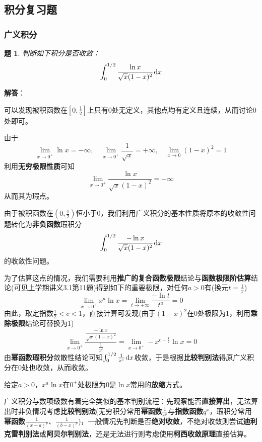 \documentclass[a4paper,UTF8,fontset=windows,AutoFakeBold]{ctexart}
\newcommand*{\dr}{\hspace{0.07em}\mathrm{d}}
\newcommand*{\note}{\noindent *}
\theoremstyle{ex}
\newtheorem{exercise}{题}
\newcommand{\sol}[1]{{\vspace{5pt}\kaishu\noindent\textbf{解答}：\vspace{-3pt}
\begin{compactitem}
    \item[] #1
\end{compactitem}
}}
\begin{document}
\subsection{积分复习题}
\subsubsection{广义积分}
\begin{framed}
\begin{exercise}\label{xlnx}
    判断如下积分是否收敛：
    $$\int_0^{1/2}\frac{\ln x}{\sqrt{x}(1-x)^2}\dr x$$
\end{exercise}
\sol{
    可以发现被积函数在$[0,\frac{1}{2}]$上只有0处无定义，其他点均有定义且连续，从而讨论0处即可。
    
    由于
    $$\lim_{x\to0^+}\ln x=-\infty,\quad\lim_{x\to0^+}\frac{1}{\sqrt{x}}=+\infty,\quad\lim_{x\to0}(1-x)^2=1$$
    利用\textbf{无穷极限性质}可知
    $$\lim_{x\to0^+}\frac{\ln x}{\sqrt{x}(1-x)^2}=-\infty$$
    从而其为瑕点。

    由于被积函数在$(0,\frac{1}{2})$恒小于0，我们利用广义积分的基本性质将原本的收敛性问题转化为\textbf{非负函数}瑕积分
    $$\int_0^{1/2}\frac{-\ln x}{\sqrt{x}(1-x)^2}\dr x$$
    的收敛性问题。

    为了估算这点的情况，我们需要利用\textbf{推广的复合函数极限}结论与\textbf{函数极限阶估算}结论(可见上学期讲义3.1第11题)得到如下的重要极限，对任何$a>0$有(换元$t=\frac{1}{x}$)
    $$\lim_{x\to0^+}x^a\ln x=\lim_{t\to+\infty}\frac{-\ln t}{t^a}=0$$
    由此，取定指数$\frac{1}{2}<c<1$，直接计算可发现(由于$(1-x)^2$在0处极限为1，利用\textbf{乘除极限}结论可替换为1)
    $$\lim_{x\to0^+}\frac{\frac{-\ln x}{\sqrt{x}(1-x)^2}}{\frac{1}{x^c}}=\lim_{x\to0^+}-x^{c-\frac{1}{2}}\ln x=0$$
    由\textbf{幂函数瑕积分}敛散性结论可知$\int_0^{1/2}\frac{1}{x^c}\dr x$收敛，于是根据\textbf{比较判别法}得原广义积分在0处也收敛，从而收敛。
}
\end{framed}

\note 给定$a>0$，$x^a\ln x$在$0^+$处极限为0是$\ln x$常用的\textbf{放缩}方式。

\note 广义积分与数项级数有着完全类似的基本判别流程：先观察能否\textbf{直接算出}，无法算出时非负情况考虑\textbf{比较判别法}(无穷积分常用\textbf{幂函数}$\frac{1}{x^p}$与\textbf{指数函数}$q^x$，瑕积分常用\textbf{幂函数}$\frac{1}{(x-a)^p}$、$\frac{1}{(b-x)^p}$)，一般情况先判断是否\textbf{绝对收敛}，不绝对收敛则尝试\textbf{迪利克雷判别法}或\textbf{阿贝尔判别法}，还是无法进行则考虑使用\textbf{柯西收敛原理}直接估算。
\end{document}
